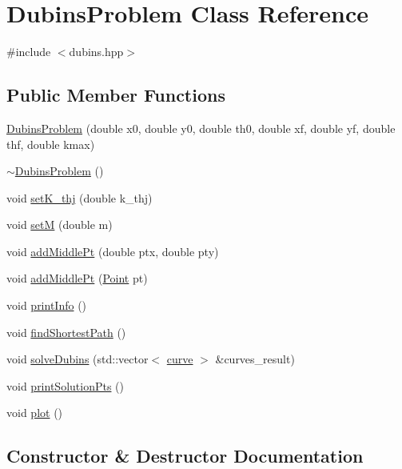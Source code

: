 \hypertarget{classDubinsProblem}{}\section{Dubins\+Problem Class Reference}
\label{classDubinsProblem}


{\ttfamily \#include $<$dubins.\+hpp$>$}

\subsection*{Public Member Functions}
\begin{DoxyCompactItemize}
\item 
\hyperlink{classDubinsProblem_a8db789eb32e4e037fc83ba9d9c022c71}{Dubins\+Problem} (double x0, double y0, double th0, double xf, double yf, double thf, double kmax)
\item 
\hyperlink{classDubinsProblem_a2b7c66d216680dad6e620e58cb42d6a0}{$\sim$\+Dubins\+Problem} ()
\item 
void \hyperlink{classDubinsProblem_a1d51536aca57d3abd2bb1ee2700dd190}{set\+K\+\_\+thj} (double k\+\_\+thj)
\item 
void \hyperlink{classDubinsProblem_a60fd252945b094bb75769e8bd4b36a0a}{setM} (double m)
\item 
void \hyperlink{classDubinsProblem_a375b20e20c195abd0ed114a16ab9537b}{add\+Middle\+Pt} (double ptx, double pty)
\item 
void \hyperlink{classDubinsProblem_ac44f2f05af23a259de0efa91a4c201bd}{add\+Middle\+Pt} (\hyperlink{structPoint}{Point} pt)
\item 
void \hyperlink{classDubinsProblem_a2323a0a9fa590bbf006f3b2dea2bac7b}{print\+Info} ()
\item 
void \hyperlink{classDubinsProblem_a8a76818b50367c97f53f6f19c3b6d262}{find\+Shortest\+Path} ()
\item 
void \hyperlink{classDubinsProblem_afd0ad92fe743f54fccff590d68551973}{solve\+Dubins} (std\+::vector$<$ \hyperlink{structcurve}{curve} $>$ \&curves\+\_\+result)
\item 
void \hyperlink{classDubinsProblem_afc8c56102f493d8513f9e5d2d97b4f6c}{print\+Solution\+Pts} ()
\item 
void \hyperlink{classDubinsProblem_a1e80812da8fb88a10ae948c2ed784e58}{plot} ()
\end{DoxyCompactItemize}


\subsection{Constructor \& Destructor Documentation}
